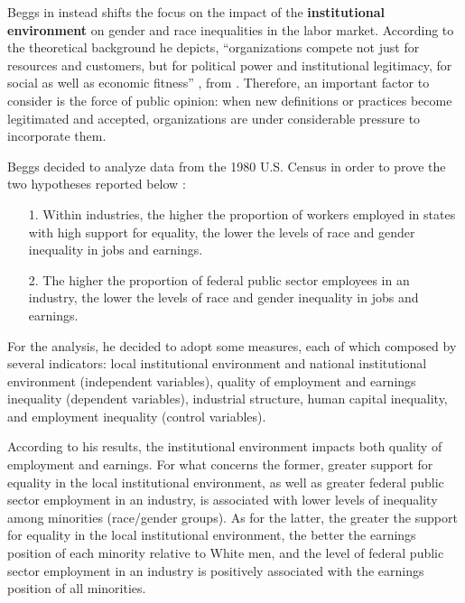 Beggs in \cite{beggs1995institutional} instead shifts the focus on the impact of the \textbf{institutional environment} on gender and race inequalities in the labor market. According to the theoretical background he depicts, ``organizations compete not just for resources and customers, but for political power and institutional legitimacy, for social as well as economic fitness'' \cite[p.~613]{beggs1995institutional}, from \cite[p.~150]{dimaggio1983iron}. Therefore, an important factor to consider is the force of public opinion: when new definitions or practices become legitimated and accepted, organizations are under considerable pressure to incorporate them.

Beggs decided to analyze data from the 1980 U.S. Census in order to prove the two hypotheses reported below \cite{beggs1995institutional}:
\begin{itemize}
\item[1.] Within industries, the higher the proportion of workers employed in states with high support for equality, the lower the levels of race and gender inequality in jobs and earnings.
\item[2.] The higher the proportion of federal public sector employees in an industry, the lower the levels of race and gender inequality in jobs and earnings.
\end{itemize}

For the analysis, he decided to adopt some measures, each of which composed by several indicators: local institutional environment and national institutional environment (independent variables), quality of employment and earnings inequality (dependent variables), industrial structure, human capital inequality, and employment inequality (control variables).

According to his results, the institutional environment impacts both quality of employment and earnings. For what concerns the former, greater support for equality in the local institutional environment, as well as greater federal public sector employment in an industry, is associated with lower levels of inequality among minorities (race/gender groups). As for the latter, the greater the support for equality in the local institutional environment, the better the earnings position of each minority relative to White men, and the level of federal public sector employment in an industry is positively associated with the earnings position of all minorities.


